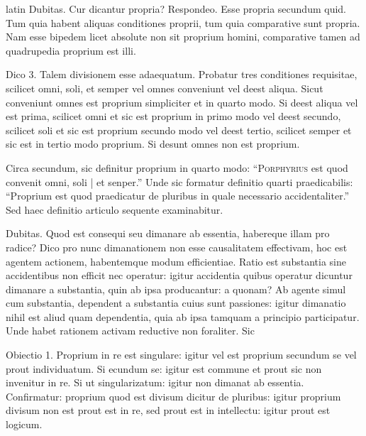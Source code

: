 \begin{otherlanguage*}{latin}
\pstart
  Dubitas. Cur dicantur propria? Respondeo. Esse propria secundum quid. Tum quia habent aliquas conditiones proprii, tum quia comparative sunt propria. Nam esse bipedem licet absolute non sit proprium homini, comparative tamen ad quadrupedia proprium est illi. 
\pend

\pstart
  Dico 3. Talem divisionem esse adaequatum. Probatur tres conditiones requisitae, scilicet omni, soli, et semper vel omnes conveniunt vel deest aliqua. Sicut conveniunt omnes est proprium simpliciter et in quarto modo. Si deest aliqua vel est prima, scilicet omni et sic est proprium in primo modo vel deest secundo, scilicet soli et sic est proprium secundo modo vel deest tertio, scilicet semper et sic est in tertio modo proprium. Si desunt omnes non est proprium. 
\pend

\pstart
  Circa secundum, sic definitur proprium in quarto modo: \enquote{\textsc{Porphyrius} est quod convenit omni, soli \textnormal{|} et senper.} Unde sic formatur definitio quarti praedicabilis: \enquote{Proprium est quod praedicatur de pluribus in quale necessario accidentaliter.} Sed haec definitio articulo sequente examinabitur. 
\pend

\pstart
  Dubitas. Quod est consequi seu dimanare ab essentia, habereque illam pro radice? Dico pro nunc dimanationem non esse causalitatem effectivam, hoc est agentem actionem, habentemque modum efficientiae. Ratio est substantia sine accidentibus non efficit nec operatur: igitur accidentia quibus operatur dicuntur dimanare a substantia, quin ab ipsa producantur: a quonam? Ab agente simul cum substantia, dependent a substantia cuius sunt passiones: igitur dimanatio nihil est aliud quam dependentia, quia ab ipsa tamquam a principio participatur. Unde habet rationem activam reductive non foraliter. Sic  
\pend

\pstart
  Obiectio 1. Proprium in re est singulare: igitur vel est proprium secundum se vel prout individuatum. Si ecundum se: igitur est commune et prout sic non invenitur in re. Si ut singularizatum: igitur non dimanat ab essentia. Confirmatur: proprium quod est divisum dicitur de pluribus: igitur proprium divisum non est prout est in re, sed prout est in intellectu: igitur prout est logicum. 
\pend


\end{otherlanguage*}
